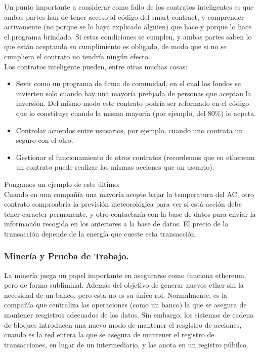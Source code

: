 \documentclass[11pt,a4paper]{article}
\begin{document}
Un punto importante a considerar como fallo de los contratos inteligentes es que ambas partes han de tener acceso al código del smart contract, y comprender activamente (no porque se lo haya explicado alguien) que hace y porque lo hace el programa brindado. Si estas condiciones se cumplen, y ambas partes saben lo que están aceptando su cumplimiento es obligado, de modo que si no se cumpliera el contrato no tendría ningún efecto.\\

Los contratos inteligente pueden, entre otras muchas cosas:
\begin{itemize}
\item Sevir como un programa de firma de comunidad, en el cual los fondos se invierten solo cuando hay una mayoría prefijada de personas que aceptan la inversión. Del mismo modo este contrato podría ser reformado en el código que lo constituye cuando la misma mayoría (por ejemplo, del 80\%) lo acpeta.
\item Controlar acuerdos entre ususarios, por ejemplo, cuando uno contrata un seguro con el otro.
\item Gestionar el funcionamiento de otros contratos (recordemos que en ethereum un contrato puede realizar las mismas acciones que un usuario).
\end{itemize}

Pongamos un  ejemplo de este último:\\

Cuando en una compañía una mayoría acepte bajar la temperatura del AC, otro contrato comproabría la previsión meteorológica para ver si está acción debe tener caracter permanente, y otro contactaría con la base de datos para enviar la información recogida en los anteriores a la base de datos. El precio de la transacción depende de la energía que cueste esta transacción.

\subsubsection{Minería y Prueba de Trabajo.}

La minería juega un papel importante en asegurarse como funciona ethereum, pero de forma subliminal. Además del objetivo de generar nuevos ether sin la necesidad de un banco, pero esta no es su único rol. Normalmente, es la compañía que centraliza las operaciones (como un banco) la que se asegura de mantener resgistros adecuados de los datos. Sin embargo, los sistemas de cadena de bloques introducen una nuevo modo de mantener el resgistro de acciones, cuando es la red entera la que se asegura de mantener el registro de transacciones, en lugar de un intermediario, y las anota en un registro púbilco.\\ 
\end{document}
